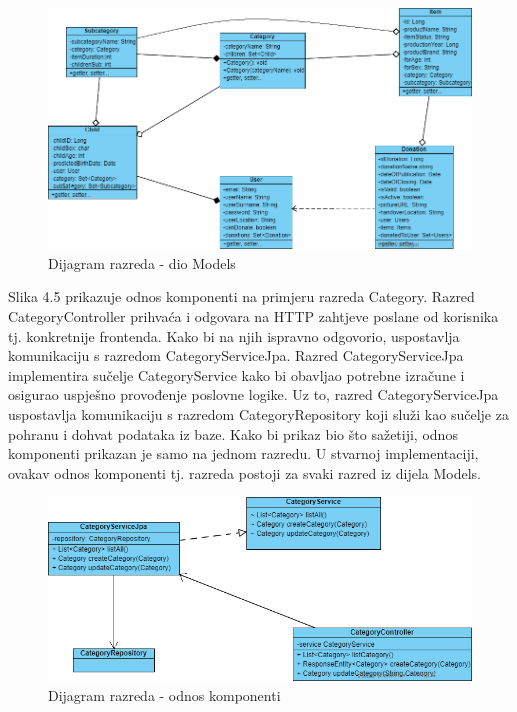 			\begin{figure}[H]
				\includegraphics[width=\textwidth,height=0.35\textheight]{dijagrami/Modeli.png}
				\centering
				\caption{Dijagram razreda - dio Models}
				\label{fig:Models}
			\end{figure}
			\eject
			Slika 4.5 prikazuje odnos komponenti na primjeru razreda Category. Razred CategoryController prihvaća i odgovara na HTTP zahtjeve poslane od korisnika tj. konkretnije frontenda. Kako bi na njih ispravno odgovorio, uspostavlja komunikaciju s razredom CategoryServiceJpa.
			Razred CategoryServiceJpa implementira sučelje CategoryService kako bi obavljao potrebne izračune i osigurao uspješno provođenje poslovne logike. Uz to, razred CategoryServiceJpa uspostavlja komunikaciju s razredom CategoryRepository koji služi kao sučelje za pohranu i dohvat podataka iz baze.
			Kako bi prikaz bio što sažetiji, odnos komponenti prikazan je samo na jednom razredu. U stvarnoj implementaciji, ovakav odnos komponenti tj. razreda postoji za svaki razred iz dijela Models.\\[10pt]

			\begin{figure}[H]
				\includegraphics[width=\textwidth,height=0.35\textheight]{dijagrami/OdnosKomponenti.png}
				\centering
				\caption{Dijagram razreda - odnos komponenti}
				\label{fig:OdnosKomponenti}
			\end{figure}

